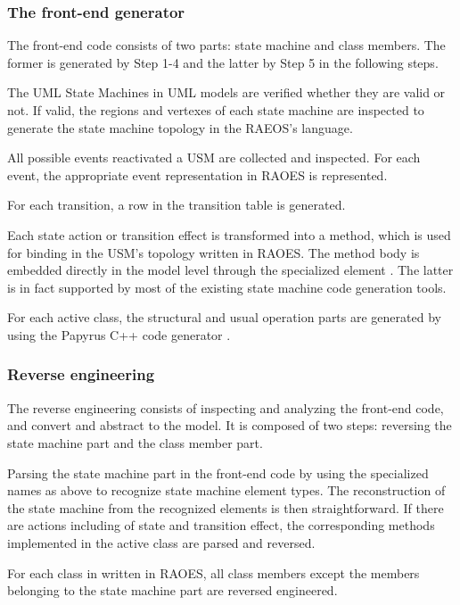 \subsubsection{The front-end generator}
\label{subsubsec:gen}
The front-end code consists of two parts: state machine and class members.
The former is generated by Step 1-4 and the latter by Step 5 in the following steps.
\begin{description}[\footnotesize]
	\item[Step 1] The UML State Machines in UML models are verified whether they are valid or not. 
	If valid, the regions and vertexes of each state machine %
	are inspected to generate the state machine topology in the RAEOS's language. 
	\item[Step 2] All possible events reactivated a USM are collected and inspected. 
	For each event, the appropriate event representation in RAOES is represented.
	
	\item[Step 3] For each transition, a row in the transition table is generated.
	
	\item[Step 4] Each state action or transition effect is transformed into a method, which is used for binding in the USM's topology written in RAOES. 
	The method body is embedded directly in the model level through the specialized element . 
	The latter is in fact supported by most of the existing state machine code generation tools.
	
	\item[Step 5] For each active class, the structural and usual operation parts are generated by using the Papyrus C++ code generator \cite{_papyrus/designer/code-generation_????}. 
\end{description}

\noindent
\subsubsection{Reverse engineering}
\label{subsubsec:reverse}
The reverse engineering consists of inspecting and analyzing the front-end code, and convert and abstract to the model. 
It is composed of two steps: reversing the state machine part and the class member part.

\begin{description}[\footnotesize]
	\item[Step 1] Parsing the state machine part in the front-end code by using the specialized names as above to recognize state machine element types.
	The reconstruction of the state machine from the recognized elements is then straightforward.
	If there are actions including  of state and transition effect, the corresponding methods implemented in the active class are parsed and reversed.
	
	\item[Step 2] For each class in written in RAOES, all class members except the members belonging to the state machine part are reversed engineered.
\end{description}


